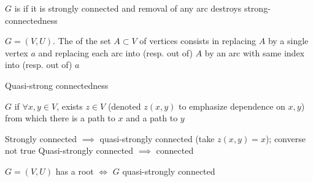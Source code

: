 \documentclass[aspectratio=169]{beamer}\usepackage[]{graphicx}\usepackage[]{xcolor}
\begin{document}
\begin{frame}
	\begin{definition}
	$G$ is  if it is strongly connected and removal of any arc destroys strong-connectedness
	\end{definition}
	\vfill
	\begin{definition}[Contraction]
	$G=(V,U)$. The  of the set $A\subset V$ of vertices consists in replacing $A$ by a single vertex $a$ and replacing each arc into (resp. out of) $A$ by an arc with same index into (resp. out of) $a$
	\end{definition}
\end{frame}
	
		
\begin{frame}{Quasi-strong connectedness}
	\begin{definition}
	$G$  if $\forall x,y\in V$, exists $z\in V$ (denoted $z(x,y)$ to emphasize dependence on $x,y$) from which there is a path to $x$ and a path to $y$
	\end{definition}
	\vfill
	Strongly connected $\implies$ quasi-strongly connected (take $z(x,y)=x$); converse not true
	\vfill
	Quasi-strongly connected $\implies$ connected
	\vfill
	\begin{lemma}
	$G=(V,U)$ has a root $\iff$ $G$ quasi-strongly connected
	\end{lemma}
\end{frame}
\end{document}

